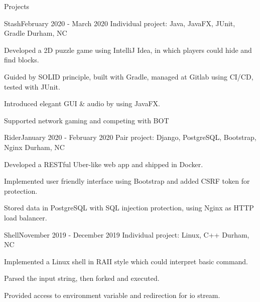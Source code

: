 \documentclass{resume} %
\begin{document}
\begin{rSection}{Projects}
    \begin{rSubsection}{Stash}{February 2020 - March 2020}
        {Individual project: Java, JavaFX, JUnit, Gradle}
        {Durham, NC}
        \item Developed a 2D puzzle game using IntelliJ Idea, in which players could hide and find blocks. 
        \item Guided by SOLID principle, built with Gradle, managed at Gitlab using CI/CD, tested with JUnit.
        \item Introduced elegant GUI \& audio by using JavaFX.
        \item Supported network gaming and competing with BOT
        \end{rSubsection}

    \begin{rSubsection}{Rider}{January 2020 - February 2020}
        {Pair project: Django, PostgreSQL, Bootstrap, Nginx}
        {Durham, NC}
        \item Developed a RESTful Uber-like web app and shipped in Docker.
        \item Implemented user friendly interface using Bootstrap and added CSRF token for protection.
        \item Stored data in PostgreSQL with SQL injection protection, using Nginx as HTTP load balancer.
        \end{rSubsection}

    \begin{rSubsection}{Shell}{November 2019 - December 2019}
    {Individual project: Linux, C++}
    {Durham, NC}
    \item Implemented a Linux shell in RAII style which could interpret basic command.
    \item Parsed the input string, then forked and executed.
    \item Provided access to environment variable and redirection for io stream.
    \end{rSubsection}




\end{rSection}


\end{document}
